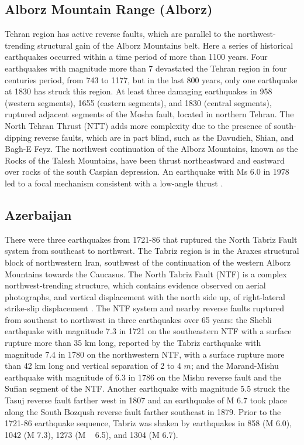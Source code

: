 \subsection{Alborz Mountain Range (Alborz)}
Tehran region has active reverse faults, which are parallel to the northwest-trending structural gain of the Alborz Mountains belt. Here a series of historical earthquakes occurred within a time period of more than 1100 years. Four earthquakes with magnitude more than 7 devastated the Tehran region in four centuries period, from 743 to 1177, but in the last 800 years, only one earthquake at 1830 has struck this region. At least three damaging earthquakes in 958 (western segments), 1655 (eastern segments), and 1830 (central segments), ruptured adjacent segments of the Mosha fault, located in northern Tehran.
The North Tehran Thrust (NTT) adds more complexity due to the presence of south-dipping reverse faults, which are in part blind, such as the Davudieh, Shian, and Bagh-E Feyz.
The northwest continuation of the Alborz Mountains, known as the Rocks of the Talesh Mountains, have been thrust northeastward and eastward over rocks of the south Caspian depression. An earthquake with Ms 6.0 in 1978 led to a focal mechanism consistent with a low-angle thrust \citep{Berberian1999}.



\subsection{Azerbaijan}
There were three earthquakes from 1721-86 that ruptured the North Tabriz Fault system from southeast to northwest. The Tabriz region is in the Araxes structural block of northwestern Iran, southwest of the continuation of the western Alborz Mountains towards the Caucasus. The North Tabriz Fault (NTF) is a complex northwest-trending structure, which contains evidence observed on aerial photographs, and vertical displacement with the north side up, of right-lateral strike-slip displacement \citep{Berberian1999}.
The NTF system and nearby reverse faults ruptured from southeast to northwest in three earthquakes over 65 years: the Shebli earthquake with magnitude 7.3 in 1721 on the southeastern NTF with a surface rupture more than 35 km long, reported by \citet{Jones1834} the Tabriz earthquake with magnitude 7.4 in 1780 on the northwestern NTF, with a surface rupture more than 42 km long and vertical separation of 2 to 4 $m$; and the Marand-Mishu earthquake with magnitude of 6.3 in 1786 on the Mishu reverse fault and the Sufian segment of the NTF. Another earthquake with  magnitude 5.5 struck the Tasuj reverse fault farther west in 1807 and an earthquake of M 6.7 took place along the South Bozqush reverse fault farther southeast in 1879. Prior to the 1721-86 earthquake sequence, Tabriz was shaken by earthquakes in 858 (M 6.0), 1042 (M 7.3), 1273 (M ~ 6.5), and 1304 (M 6.7)\citep{Berberian1999}. 



